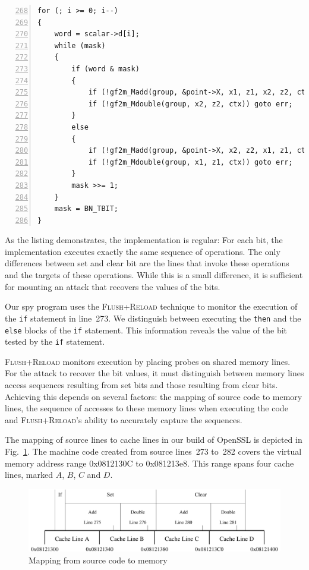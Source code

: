 \documentclass[twocolumn]{svjour3}
\newcommand{\fl}{\textsc{Flu\-sh+\allowbreak Re\-load}\xspace}
\begin{document}
\begin{lstlisting}[numbers=left,firstnumber=268,float=htb,caption=OpenSSL implementation of the Montgomery ladder,label=lst:openssl]
for (; i >= 0; i--)
{
    word = scalar->d[i];
    while (mask)
    {
        if (word & mask)
        {
            if (!gf2m_Madd(group, &point->X, x1, z1, x2, z2, ctx)) goto err;
            if (!gf2m_Mdouble(group, x2, z2, ctx)) goto err;
        }
        else
        {
            if (!gf2m_Madd(group, &point->X, x2, z2, x1, z1, ctx)) goto err;
            if (!gf2m_Mdouble(group, x1, z1, ctx)) goto err;
        }
        mask >>= 1;
    }
    mask = BN_TBIT;
}
\end{lstlisting}

As the listing demonstrates, the implementation is regular: For each bit, the implementation executes exactly the same sequence of operations.
The only differences between set and clear bit are the lines that invoke these operations and the targets of these operations.
While this is a small difference, it is sufficient for mounting an attack that recovers 
the values of the bits.


Our spy program uses the \fl technique to monitor the execution of the \texttt{if}
statement in line~273.
We distinguish between executing the \texttt{then} and the \texttt{else} blocks of the \texttt{if}
statement.
This information reveals the value of the bit tested by the \texttt{if} statement.

\fl monitors execution by placing probes on shared memory lines.
For the attack to recover the bit values, it must distinguish between memory lines access sequences
resulting from set bits and those resulting from clear bits.
Achieving this depends on several factors: the mapping of source code to memory lines, 
the sequence of accesses to these memory lines when executing the code and 
\fl's ability to accurately capture the sequences.


The mapping of source lines to cache lines in our build of OpenSSL is depicted in Fig.~\ref{dgm:memory}.
The machine code created from source lines~273 to~282 covers the virtual memory address range 0x0812130C
to 0x081213e8.
This range spans four cache lines, marked $A$, $B$, $C$ and $D$.


\begin{figure}[htb]
\centering\includegraphics[width=\columnwidth]{memory}
\caption{Mapping from source code to memory\label{dgm:memory}}
\end{figure}
\end{document}
